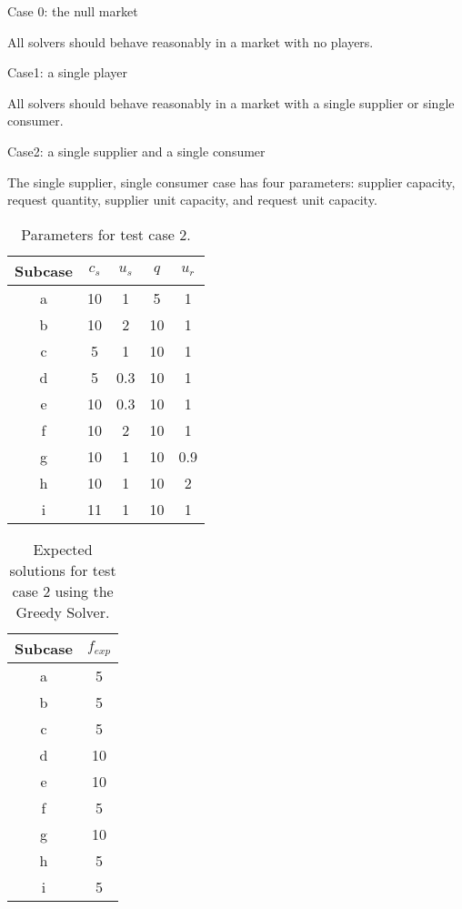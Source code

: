 Case 0: the null market

All solvers should behave reasonably in a market with no players.

Case1: a single player

All solvers should behave reasonably in a market with a single supplier or
single consumer.

Case2: a single supplier and a single consumer

The single supplier, single consumer case has four parameters: supplier
capacity, request quantity, supplier unit capacity, and request unit capacity.

\begin{table}[ht]
  \begin{center}
    \caption{Parameters for test case 2.}
    \begin{tabular}{ccccc}
    \toprule
    Subcase & $c_s$ & $u_s$ & $q$ & $u_r$\\
    \midrule
    a & 10 & 1   & 5  & 1   \\
    b & 10 & 2   & 10 & 1   \\
    c & 5  & 1   & 10 & 1   \\
    d & 5  & 0.3 & 10 & 1   \\
    e & 10 & 0.3 & 10 & 1   \\
    f & 10 & 2   & 10 & 1   \\
    g & 10 & 1   & 10 & 0.9 \\
    h & 10 & 1   & 10 & 2   \\
    i & 11 & 1   & 10 & 1   \\
    \bottomrule
    \end{tabular}
  \end{center}
\end{table}

\begin{table}[ht]
  \begin{center}
    \caption{Expected solutions for test case 2 using the Greedy Solver.}
    \begin{tabular}{cc}
    \toprule
    Subcase & $f_{exp}$\\
    \midrule
    a & 5  \\
    b & 5  \\
    c & 5  \\
    d & 10 \\
    e & 10 \\
    f & 5  \\
    g & 10 \\
    h & 5  \\
    i & 5  \\
    \bottomrule
    \end{tabular}
  \end{center}
\end{table}

